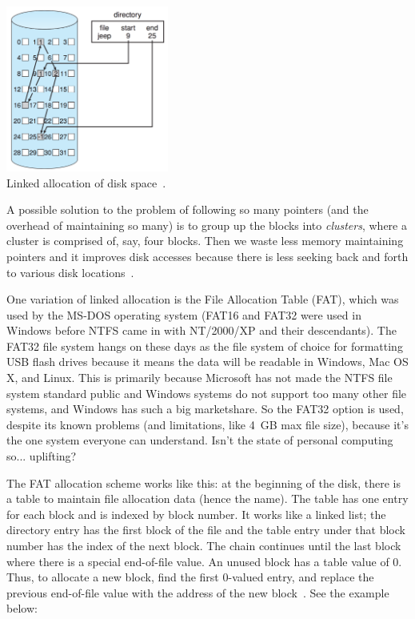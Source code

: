\begin{center}
	\includegraphics[width=0.4\textwidth]{images/disk-linked.png}\\
	Linked allocation of disk space~\cite{osc}.
\end{center}

A possible solution to the problem of following so many pointers (and the overhead of maintaining so many) is to group up the blocks into \textit{clusters}, where a cluster is comprised of, say, four blocks. Then we waste less memory maintaining pointers and it improves disk accesses because there is less seeking back and forth to various disk locations~\cite{osc}. 

One variation of linked allocation is the File Allocation Table (FAT), which was used by the MS-DOS operating system (FAT16 and FAT32 were used in Windows before NTFS came in with NT/2000/XP and their descendants). The FAT32 file system hangs on these days as the file system of choice for formatting USB flash drives because it means the data will be readable in Windows, Mac OS X, and Linux. This is primarily because Microsoft has not made the NTFS file system standard public and Windows systems do not support too many other file systems, and Windows has such a big marketshare. So the FAT32 option is used, despite its known problems (and limitations, like 4~GB max file size), because it's the one system everyone can understand. Isn't the state of personal computing so... uplifting?

The FAT allocation scheme works like this: at the beginning of the disk, there is a table to maintain file allocation data (hence the name). The table has one entry for each block and is indexed by block number. It works like a linked list; the directory entry has the first block of the file and the table entry under that block number has the index of the next block. The chain continues until the last block where there is a special end-of-file value. An unused block has a table value of 0. Thus, to allocate a new block, find the first 0-valued entry, and replace the previous end-of-file value with the address of the new block~\cite{osc}. See the example below:


